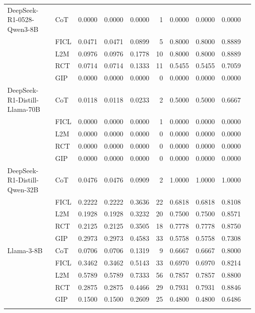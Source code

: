 \documentclass[conference]{IEEEtran}
\begin{document}
\begin{longtable}{p{3.5cm} l r r r r r r r r}
DeepSeek-R1-0528-Qwen3-8B & CoT  & 0.0000 & 0.0000 & 0.0000 & 1 & 0.0000 & 0.0000 & 0.0000 \\
                          & FICL & 0.0471 & 0.0471 & 0.0899 & 5 & 0.8000 & 0.8000 & 0.8889 \\
                          & L2M  & 0.0976 & 0.0976 & 0.1778 & 10 & 0.8000 & 0.8000 & 0.8889 \\
                          & RCT  & 0.0714 & 0.0714 & 0.1333 & 11 & 0.5455 & 0.5455 & 0.7059 \\
                          & GIP  & 0.0000 & 0.0000 & 0.0000 & 0 & 0.0000 & 0.0000 & 0.0000 \\ \addlinespace
DeepSeek-R1-Distill-Llama-70B & CoT  & 0.0118 & 0.0118 & 0.0233 & 2 & 0.5000 & 0.5000 & 0.6667 \\
                          & FICL & 0.0000 & 0.0000 & 0.0000 & 1 & 0.0000 & 0.0000 & 0.0000 \\
                          & L2M  & 0.0000 & 0.0000 & 0.0000 & 0 & 0.0000 & 0.0000 & 0.0000 \\
                          & RCT  & 0.0000 & 0.0000 & 0.0000 & 0 & 0.0000 & 0.0000 & 0.0000 \\
                          & GIP  & 0.0000 & 0.0000 & 0.0000 & 0 & 0.0000 & 0.0000 & 0.0000 \\ \addlinespace
DeepSeek-R1-Distill-Qwen-32B & CoT  & 0.0476 & 0.0476 & 0.0909 & 2 & 1.0000 & 1.0000 & 1.0000 \\
                          & FICL & 0.2222 & 0.2222 & 0.3636 & 22 & 0.6818 & 0.6818 & 0.8108 \\
                          & L2M  & 0.1928 & 0.1928 & 0.3232 & 20 & 0.7500 & 0.7500 & 0.8571 \\
                          & RCT  & 0.2125 & 0.2125 & 0.3505 & 18 & 0.7778 & 0.7778 & 0.8750 \\
                          & GIP  & 0.2973 & 0.2973 & 0.4583 & 33 & 0.5758 & 0.5758 & 0.7308 \\ \addlinespace
Llama-3-8B & CoT  & 0.0706 & 0.0706 & 0.1319 & 9 & 0.6667 & 0.6667 & 0.8000 \\
           & FICL & 0.3462 & 0.3462 & 0.5143 & 33 & 0.6970 & 0.6970 & 0.8214 \\
           & L2M  & 0.5789 & 0.5789 & 0.7333 & 56 & 0.7857 & 0.7857 & 0.8800 \\
           & RCT  & 0.2875 & 0.2875 & 0.4466 & 29 & 0.7931 & 0.7931 & 0.8846 \\
           & GIP  & 0.1500 & 0.1500 & 0.2609 & 25 & 0.4800 & 0.4800 & 0.6486 \\ \addlinespace

\end{longtable}
\end{document}

